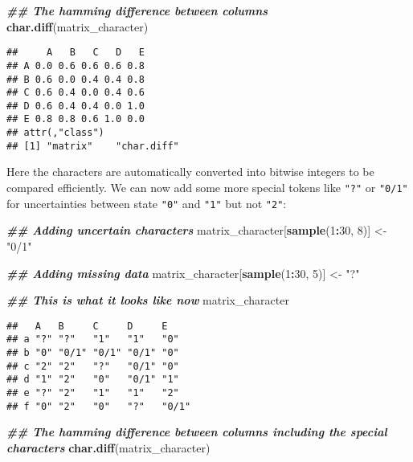 \documentclass[
]{book}
\newenvironment{Shaded}{\begin{snugshade}}{\end{snugshade}}
\newcommand{\DecValTok}[1]{\textcolor[rgb]{0.00,0.00,0.81}{#1}}
\newcommand{\DocumentationTok}[1]{\textcolor[rgb]{0.56,0.35,0.01}{\textbf{\textit{#1}}}}
\newcommand{\FunctionTok}[1]{\textcolor[rgb]{0.13,0.29,0.53}{\textbf{#1}}}
\newcommand{\NormalTok}[1]{#1}
\newcommand{\OtherTok}[1]{\textcolor[rgb]{0.56,0.35,0.01}{#1}}
\newcommand{\SpecialCharTok}[1]{\textcolor[rgb]{0.81,0.36,0.00}{\textbf{#1}}}
\newcommand{\StringTok}[1]{\textcolor[rgb]{0.31,0.60,0.02}{#1}}
\begin{document}
\begin{Shaded}
\begin{Highlighting}[]
\DocumentationTok{\#\# The hamming difference between columns}
\FunctionTok{char.diff}\NormalTok{(matrix\_character)}
\end{Highlighting}
\end{Shaded}

\begin{verbatim}
##     A   B   C   D   E
## A 0.0 0.6 0.6 0.6 0.8
## B 0.6 0.0 0.4 0.4 0.8
## C 0.6 0.4 0.0 0.4 0.6
## D 0.6 0.4 0.4 0.0 1.0
## E 0.8 0.8 0.6 1.0 0.0
## attr(,"class")
## [1] "matrix"    "char.diff"
\end{verbatim}

Here the characters are automatically converted into bitwise integers to be compared efficiently. We can now add some more special tokens like \texttt{"?"} or \texttt{"0/1"} for uncertainties between state \texttt{"0"} and \texttt{"1"} but not \texttt{"2"}:

\begin{Shaded}
\begin{Highlighting}[]
\DocumentationTok{\#\# Adding uncertain characters}
\NormalTok{matrix\_character[}\FunctionTok{sample}\NormalTok{(}\DecValTok{1}\SpecialCharTok{:}\DecValTok{30}\NormalTok{, }\DecValTok{8}\NormalTok{)] }\OtherTok{\textless{}{-}} \StringTok{"0/1"}

\DocumentationTok{\#\# Adding missing data}
\NormalTok{matrix\_character[}\FunctionTok{sample}\NormalTok{(}\DecValTok{1}\SpecialCharTok{:}\DecValTok{30}\NormalTok{, }\DecValTok{5}\NormalTok{)] }\OtherTok{\textless{}{-}} \StringTok{"?"}

\DocumentationTok{\#\# This is what it looks like now}
\NormalTok{matrix\_character}
\end{Highlighting}
\end{Shaded}

\begin{verbatim}
##   A   B     C     D     E    
## a "?" "?"   "1"   "1"   "0"  
## b "0" "0/1" "0/1" "0/1" "0"  
## c "2" "2"   "?"   "0/1" "0"  
## d "1" "2"   "0"   "0/1" "1"  
## e "?" "2"   "1"   "1"   "2"  
## f "0" "2"   "0"   "?"   "0/1"
\end{verbatim}

\begin{Shaded}
\begin{Highlighting}[]
\DocumentationTok{\#\# The hamming difference between columns including the special characters}
\FunctionTok{char.diff}\NormalTok{(matrix\_character)}
\end{Highlighting}
\end{Shaded}
\end{document}
